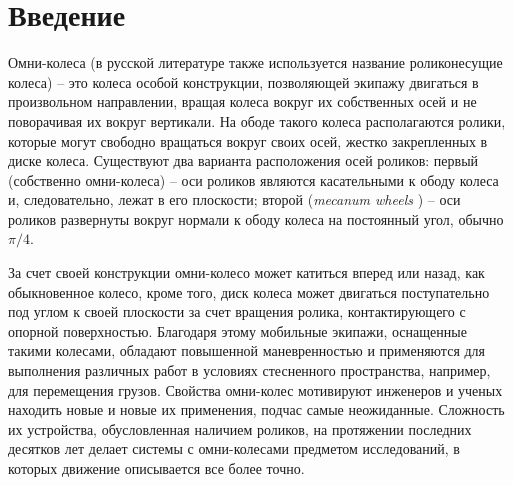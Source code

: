 \section*{Введение}

Омни-колеса (в русской литературе также используется название роликонесущие колеса) -- это колеса особой конструкции, позволяющей экипажу двигаться в произвольном направлении, вращая колеса вокруг их собственных осей и не поворачивая их вокруг вертикали. На ободе такого колеса располагаются ролики, которые могут свободно вращаться вокруг своих осей, жестко закрепленных в диске колеса. Существуют два варианта расположения осей роликов: первый  (собственно омни-колеса) -- оси роликов являются касательными к ободу колеса и, следовательно, лежат в его плоскости; второй (\textit{mecanum wheels} \cite{Gfrerrer2008}) -- оси роликов развернуты вокруг нормали к ободу колеса на постоянный угол, обычно $\pi/4$.

За счет своей конструкции омни-колесо может катиться вперед или назад, как обыкновенное колесо, кроме того, диск колеса может двигаться поступательно под углом к своей плоскости за счет вращения ролика, контактирующего с опорной поверхностью. Благодаря этому мобильные экипажи, оснащенные такими колесами, обладают повышенной маневренностью и применяются для выполнения различных работ в условиях стесненного пространства, например, для перемещения грузов.
Свойства омни-колес мотивируют инженеров и ученых находить новые и новые их применения, подчас самые неожиданные.
Сложность их устройства, обусловленная наличием роликов, на протяжении последних десятков лет делает системы с омни-колесами предметом исследований, в которых движение описывается все более точно.

